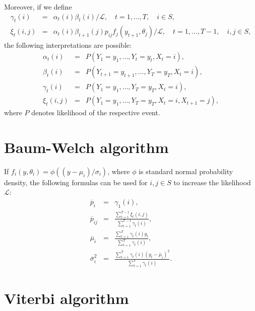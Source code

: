 \documentclass[a4paper,11pt]{article}
\renewcommand{\Pr}{\mathit{P}}
\begin{document}
Moreover, if we define
\begin{eqnarray}
  \label{eq:gamma}
  \gamma_t(i) & = & \alpha_t(i)\beta_t(i) / \mathcal{L}, \hspace{1em} t
  = 1, \ldots, T, \hspace{1em} i \in S, \\
  \label{eq:xi}
  \xi_t(i, j) & = &
  \alpha_t(i)\beta_{t + 1}(j)p_{ij} f_j(y_{t + 1}, \theta_j) / \mathcal{L},
  \hspace{1em}
  t = 1, \ldots, T - 1, \hspace{1em} i, j \in S,
\end{eqnarray}
the following interpretations are possible:
\begin{eqnarray*}
  \alpha_t(i) & = & \Pr(Y_1 = y_1, \ldots, Y_t = y_t, X_t = i),
  \\ \beta_t(i) & = & \Pr(Y_{t + 1} = y_{t + 1}, \ldots, Y_T = y_T, X_t
  = i), \\
  \gamma_t(i) & = & \Pr(Y_1 = y_1, \ldots, Y_T = y_T, X_t = i), \\
  \xi_t(i, j) & = & \Pr(Y_1 = y_1, \ldots, Y_T = y_T, X_t = i,
  X_{t + 1} = j),
\end{eqnarray*}
where $\Pr$ denotes likelihood of the respective event.

\section{Baum-Welch algorithm}

If $f_i(y, \theta_i) = \phi((y - \mu_i) / \sigma_i)$, where $\phi$ is
standard normal probability density, the following formulas can be
used for $i, j \in S$ to increase the likelihood $\mathcal{L}$:
\begin{eqnarray}
  \label{eq:baumwelchp}
  \overline{p}_i & = & \gamma_1(i), \\
  \label{eq:baumwelchP}
  \overline{p}_{ij} & = & \frac{\sum_{t = 1}^{T - 1} \xi_t(i,
    j)}{\sum_{t = 1}^{T - 1} \gamma_t(i)}, \\
  \label{eq:baumwelchmu}
  \overline{\mu}_{i} & = & \frac{\sum_{t = 1}^T \gamma_t(i)y_t}{\sum_{t
      = 1}^T \gamma_t(i)}, \\
  \label{eq:baumwelchsigma}
  \overline{\sigma}_i^2 & = & \frac{\sum_{t = 1}^T \gamma_t(i)(y_t -
    \overline{\mu}_i)^2}{\sum_{t = 1}^T \gamma_t(i)}.
\end{eqnarray}

\section{Viterbi algorithm}
\end{document}
